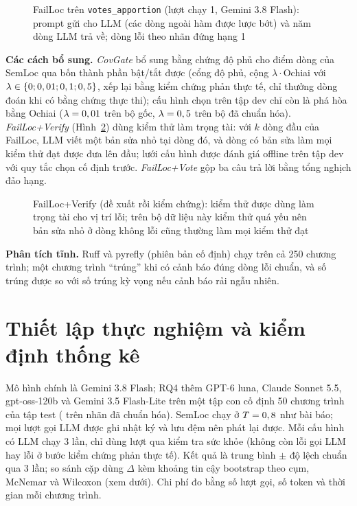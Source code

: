 \begin{figure}[H]\centering

\caption{FailLoc trên \texttt{votes\_apportion} (lượt chạy 1, Gemini 3.8 Flash): prompt gửi cho LLM (các dòng ngoài hàm được lược bớt) và năm dòng LLM trả về; dòng lỗi theo nhãn đứng hạng 1}\label{fig:failloc-vd}
\end{figure}

\textbf{Các cách bổ sung.} \emph{CovGate} bổ sung bằng chứng độ phủ cho điểm dòng của SemLoc qua bốn thành phần bật/tắt
được (cổng độ phủ, cộng $\lambda\cdot$Ochiai với $\lambda \in \{0; 0,01; 0,1; 0,5\}$, xếp lại bằng kiểm chứng phản thực
tế, chỉ thưởng dòng đoán khi có bằng chứng thực thi); cấu hình chọn trên tập dev chỉ còn là phá hòa bằng Ochiai
($\lambda = 0,01$ trên bộ gốc, $\lambda = 0,5$ trên bộ đã chuẩn hóa).
\emph{FailLoc+Verify} (Hình~\ref{fig:verify}) dùng kiểm thử làm trọng tài: với $k$ dòng đầu của FailLoc, LLM viết một bản
sửa nhỏ tại dòng đó, và dòng có bản sửa làm mọi kiểm thử đạt được đưa lên đầu; lưới \PavGridSize{} cấu hình được đánh
giá offline trên tập dev với quy tắc chọn cố định trước. \emph{FailLoc+Vote} gộp ba câu trả lời bằng tổng nghịch đảo hạng.

\begin{figure}[H]\centering

\caption{FailLoc+Verify (đề xuất rồi kiểm chứng): kiểm thử được dùng làm trọng tài cho vị trí lỗi; trên bộ dữ liệu này kiểm thử quá yếu nên bản sửa nhỏ ở dòng không lỗi cũng thường làm mọi kiểm thử đạt}\label{fig:verify}
\end{figure}

\textbf{Phân tích tĩnh.} Ruff và pyrefly (phiên bản cố định) chạy trên cả 250 chương trình; một chương trình ``trúng''
khi có cảnh báo đúng dòng lỗi chuẩn, và số trúng được so với số trúng kỳ vọng nếu cảnh báo rải ngẫu nhiên.

\section{Thiết lập thực nghiệm và kiểm định thống kê}
\label{sec:thiet-lap}\label{sec:audit-phan-ra}

Mô hình chính là Gemini 3.8 Flash; RQ4 thêm GPT-6 luna, Claude Sonnet 5.5, gpt-oss-120b và Gemini 3.5 Flash-Lite trên
một tập con cố định 50 chương trình của tập test (\ParetoSemlocGeminiThreeEightFlashN{} trên nhãn đã chuẩn hóa). SemLoc chạy ở $T = 0,8$ như bài báo; mọi lượt gọi LLM được ghi nhật ký
và lưu đệm nên phát lại được. Mỗi cấu hình có LLM chạy 3 lần, chỉ dùng lượt qua kiểm tra sức khỏe (không còn lỗi gọi
LLM hay lỗi ở bước kiểm chứng phản thực tế). Kết quả là trung bình $\pm$ độ lệch chuẩn qua 3 lần; so sánh cặp dùng
$\Delta$ kèm khoảng tin cậy bootstrap theo cụm, McNemar và Wilcoxon (xem dưới). Chi phí đo bằng số lượt
gọi, số token và thời gian mỗi chương trình.

